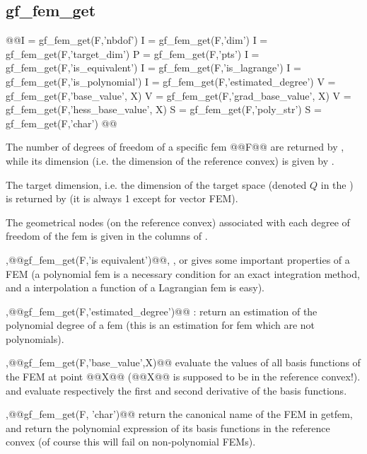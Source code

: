 \subsection{gf\_fem_get}
\begin{synopsis}
@@\tint I = gf_fem_get(\tfem F,'nbdof')
\tint I = gf_fem_get(\tfem F,'dim')
\tint I = gf_fem_get(\tfem F,'target_dim')
\tmat P = gf_fem_get(\tfem F,'pts')
\tint I = gf_fem_get(\tfem F,'is_equivalent')
\tint I = gf_fem_get(\tfem F,'is_lagrange')
\tint I = gf_fem_get(\tfem F,'is_polynomial')
\tint I = gf_fem_get(\tfem F,'estimated_degree')
\tmat V = gf_fem_get(\tfem F,'base_value', \tvec X)
\tmat V = gf_fem_get(\tfem F,'grad_base_value', \tvec X)
\tmat V = gf_fem_get(\tfem F,'hess_base_value', \tvec X)
\tstr S = gf_fem_get(\tfem F,'poly_str')
\tstr S = gf_fem_get(\tfem F,'char')
@@\end{synopsis}
\begin{cmddescription}
  The number of degrees of freedom of a
  specific fem @@F@@ are returned by ,
  while its dimension (i.e. the dimension of the reference convex) is
  given by . 

  The target dimension, i.e.  the dimension of the target space
  (denoted $Q$ in the
  ) is returned by  (it is always 1 except for vector FEM).

 The geometrical
  nodes (on the reference convex) associated with each degree of
  freedom of the fem is given in the columns of
  .
  
  \sep{@@gf_fem_get(F,'is equivalent')@@}, , or
   gives some important properties of a FEM (a
  polynomial fem is a necessary condition for an exact integration method, and
  a interpolation a function of a Lagrangian fem is easy).

  \sep{@@gf_fem_get(F,'estimated_degree')@@} : return an estimation of the polynomial degree of a fem (this is an estimation for fem which are not polynomials).\medskip
  
  \sep{@@gf_fem_get(F,'base_value',X)@@} evaluate the values of all
  basis functions of the FEM at point @@X@@
  (@@X@@ is supposed to be in the reference convex!).
   and
   evaluate respectively
  the first and second derivative of the basis functions.


  \sep{@@gf_fem_get(F, 'char')@@} return the canonical name of the FEM in
  getfem, and  return the polynomial
  expression of its basis functions in the reference convex (of course
  this will fail on non-polynomial FEMs).
\end{cmddescription}

